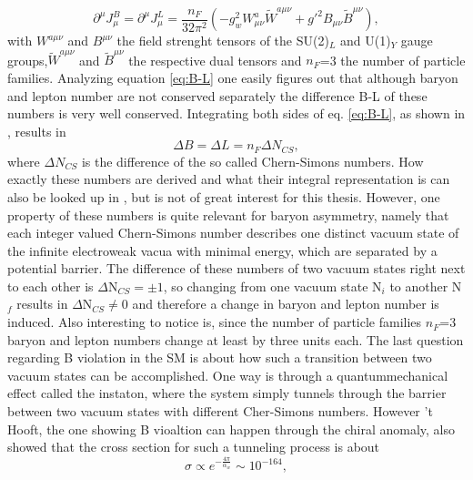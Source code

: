 \begin{equation}
\partial^\mu J_\mu^B=\partial^\mu J_\mu^L=\frac{n_F}{32\pi^2}\left(-g_w^2W^a_{\mu\nu}\tilde{W}^{a\mu\nu}+g'^2B_{\mu\nu}\tilde{B}^{\mu\nu}\right),
\label{eq:B-L}
\end{equation}
with $W^{a\mu\nu}$ and $B^{\mu\nu}$ the field strenght tensors of the SU(2)$_L$ and U(1)$_Y$ gauge groups,$\tilde{W}^{a\mu\nu}$ and $\tilde{B}^{\mu\nu}$ the respective dual tensors and $n_F$=3 the number of particle families. \newline\indent
Analyzing equation \eqref{eq:B-L} one easily figures out that although baryon and lepton number are not conserved separately the difference B-L of these numbers is very well conserved.
Integrating both sides of eq. \eqref{eq:B-L}, as shown in \cite[pp. 15f.]{Bernreuther:2002uj}, results in 
\begin{equation}
	\Delta B=\Delta L=n_F\Delta N_{CS},
	\label{eq:number_change}
\end{equation}
where $\Delta N_{CS}$ is the difference of the so called Chern-Simons numbers. How exactly these numbers are derived and what their integral representation is can also be looked up in \cite{Cline:2006ts,Petropoulos:2003pm,Bernreuther:2002uj}, but is not of great interest for this thesis. However, one property of these numbers is quite relevant for baryon asymmetry, namely that each integer valued Chern-Simons number describes one distinct vacuum state of the infinite electroweak vacua with minimal energy, which are separated by a potential barrier. The difference of these numbers of two vacuum states right next to each other is $\Delta$N$_{CS}=\pm1$, so changing from one vacuum state N$_i$ to another N$_f$ results in $\Delta$N$_{CS}\neq0$ and therefore a change in baryon and lepton number is induced. Also interesting to notice is, since the number of particle families $n_F$=3 baryon and lepton numbers change at least by three units each. \newline\indent
The last question regarding B violation in the SM is about how such a transition between two vacuum states can be accomplished. One way is through a quantummechanical effect called the instaton, where the system simply tunnels through the barrier between two vacuum states with different Cher-Simons numbers. However 't Hooft, the one showing B vioaltion can happen through the chiral anomaly, also showed  \cite[p. 18]{Bernreuther:2002uj} that the cross section for such a tunneling process is about 
\begin{equation}
	\sigma\propto e^{-\frac{4\pi}{\alpha_w}}\sim10^{-164},
	\label{eq:instaton_cross_section}
\end{equation}
